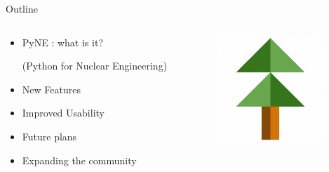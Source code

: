 \documentclass[xcolor=x11names,compress]{beamer}
\begin{document}
\begin{frame}{Outline}

	\begin{columns}
  	\begin{column}{0.5\textwidth}
	    \begin{itemize}
        \item PyNE \cite{pyne}: what is it?

        (Python for Nuclear Engineering)
        \item New Features
        \item Improved Usability
        \item Future plans
        \item Expanding the community
	    \end{itemize}
  	\end{column}
 	\begin{column}{0.4\textwidth}
 	   \begin{center}
 	   \begin{figure}
       \includegraphics[height=4cm]{pyne-icon-big.png}
	   \end{figure}
 	   \end{center}
  	\end{column}
	\end{columns}

\end{frame}

\end{document}
